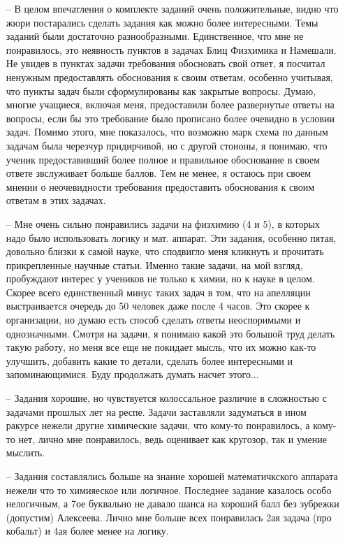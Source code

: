 \begin{itemize}
    \itemsep-0.2em
    \item[--] В целом впечатления о комплекте заданий очень положительные, видно что жюри постарались сделать задания как можно более интересными. Темы заданий были достаточно разнообразными. Единственное, что мне не понравилось, это неявность пунктов в задачах Блиц Физхимика и Намешали. Не увидев в пунктах задачи требования обосновать свой ответ, я посчитал ненужным предоставлять обоснования к своим ответам, особенно учитывая, что пункты задач были сформулированы как закрытые вопросы. Думаю, многие учащиеся, включая меня, предоставили более развернутые ответы на вопросы, если бы это требование было прописано более очевидно в условии задач. Помимо этого, мне показалось, что возможно марк схема по данным задачам была черезчур придирчивой, но с другой стоионы, я понимаю, что ученик предоставивший более полное и правильное обоснование в своем ответе звслуживает больше баллов. Тем не менее, я остаюсь при своем мнении о неочевидности требования предоставить обоснования к своим ответам в этих задачах.
    \item[--] Мне очень сильно понравились задачи на физхимию (4 и 5), в которых надо было использовать логику и мат. аппарат. Эти задания, особенно пятая, довольно близки к самой науке, что сподвигло меня кликнуть и прочитать прикрепленные научные статьи. Именно такие задачи, на мой взгляд, пробуждают интерес у учеников не только к химии, но к науке в целом. Скорее всего единственный минус таких задач в том, что на апелляции выстраивается очередь до 50 человек даже после 4 часов. Это скорее к организации, но думаю есть способ сделать ответы неоспоримыми и однозначными. Смотря на задачи, я понимаю какой это большой труд делать такую работу, но меня все еще не покидает мысль, что их можно как-то улучшить, добавить какие то детали, сделать более интересными и запоминающимися. Буду продолжать думать насчет этого...
    \item[--] Задания хорошие, но чувствуется колоссальное различие в сложностью с задачами прошлых лет на респе. Задачи заставляли задуматься в ином ракурсе нежели другие химические задачи, что кому-то понравилось, а кому-то нет, лично мне понравилось, ведь оценивает как кругозор, так и умение мыслить.
    \item[--] Задания составлялись больше на знание хорошей математичкского аппарата нежели что то химияеское или логичное. Последнее задание казалось особо нелогичным, а 7ое буквально не давало шанса на хороший балл без зубрежки (допустим) Алексеева. Лично мне больше всех понравилась 2ая задача (про кобальт) и 4ая более менее на логику.

\end{itemize}
